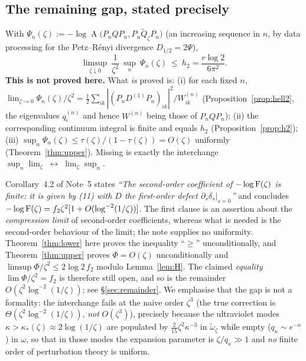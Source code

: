 \documentclass[11pt]{article}
\newcommand{\Qt}{\widetilde Q}
\newcommand{\Hell}{\operatorname{A}}
\theoremstyle{definition}\newtheorem{problem}[theorem]{Problem}
\begin{document}
\subsection{The remaining gap, stated precisely}

\begin{lemma}\label{lem:H}
With \(\Psi_n(\zeta):=-\log\Hell\bigl(P_nQP_n,P_n\Qt_\zeta P_n\bigr)\) (an increasing sequence in
\(n\), by data processing for the Petz--R\'enyi divergence \(D_{1/2}=2\Psi\)),
\[
 \limsup_{\zeta\downarrow0}\ \frac{1}{\zeta^2}\ \sup_{n}\ \Psi_n(\zeta)\ \le\ h_2
 =\frac{r\log2}{6\pi^2}.
\]
\textbf{This is not proved here.}  What \emph{is} proved is: (i) for each fixed \(n\),
\(\lim_{\zeta\to0}\Psi_n(\zeta)/\zeta^2=\frac12\sum_{ik}|(P_nD^{(1)}P_n)_{ik}|^2/W^{(n)}_{ik}\)
(Proposition~\ref{prop:hell2}, the eigenvalues \(q^{(n)}_i\) and hence \(W^{(n)}\) being those of
\(P_nQP_n\)); (ii) the corresponding continuum integral is finite and equals \(h_2\)
(Proposition~\ref{prop:h2}); (iii) \(\sup_n\Psi_n(\zeta)\le\tau(\zeta)/(1-\tau(\zeta))=O(\zeta)\)
uniformly (Theorem~\ref{thm:upper}).  Missing is exactly the interchange
\(\sup_n\lim_\zeta\;\leftrightarrow\;\lim_\zeta\sup_n\).
\end{lemma}

\begin{verdictgap}
Corollary~4.2 of Note~5 states \emph{``The second-order coefficient of \(-\log\operatorname{F}(\zeta)\) is
finite: it is given by (11) with \(D\) the first-order defect \(\partial_s\delta_s|_{s=0}\)''} and
concludes \(-\log\operatorname{F}(\zeta)=f_2\zeta^2[1+O(\log^{-2}(1/\zeta))]\).  The first clause is an
assertion about the \emph{compression limit} of second-order coefficients, whereas what is needed is
the second-order behaviour of the limit; the note supplies no uniformity.  Theorem~\ref{thm:lower}
here proves the inequality ``\(\ge\)'' unconditionally, and Theorem~\ref{thm:upper} proves
\(\Phi=O(\zeta)\) unconditionally and \(\limsup\Phi/\zeta^2\le2\log2\,f_2\) modulo
Lemma~\ref{lem:H}.  The claimed \emph{equality} \(\lim\Phi/\zeta^2=f_2\) is therefore still open,
and so is the remainder \(O(\zeta^2\log^{-2}(1/\zeta))\); see \S\ref{sec:remainder}.  We emphasise
that the gap is not a formality: the interchange fails at the naive order \(\zeta^3\) (the true
correction is \(\Theta(\zeta^2\log^{-2}(1/\zeta))\), \emph{not} \(O(\zeta^3)\)), precisely because
the ultraviolet modes \(\kappa>\kappa_*(\zeta)\approx2\log(1/\zeta)\) are populated by
\(\frac2{15}\zeta^2\kappa^{-3}\) in \(\widetilde\omega_\zeta\) while empty
(\(q_\kappa\sim e^{-\kappa}\)) in \(\omega\), so that in those modes the expansion parameter is
\(\zeta/q_\kappa\gg1\) and \emph{no} finite order of perturbation theory is uniform.
\end{verdictgap}
\end{document}
